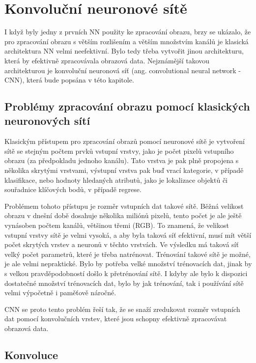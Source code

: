 \chapter{Konvoluční neuronové sítě}
\label{sec:CNN}

I když byly jedny z prvních NN použity ke zpracování obrazu, brzy se ukázalo,
že pro zpracování obrazu s větším rozlišením a větším množstvím kanálů je
klasická architektura NN velmi neefektivní. Bylo tedy třeba vytvořit jinou
architekturu, která by efektivně zpracovávala obrazová data. Nejznámější
takovou architekturou je konvoluční neuronová síť (ang. convolutional neural
network - CNN), která bude popsána v této kapitole.

\section{Problémy zpracování obrazu pomocí klasických neuronových sítí}

Klasickým přístupem pro zpracování obrazů pomocí neuronové sítě je vytvoření
sítě se stejným počtem prvků vstupní vrstvy, jako je počet pixelů vstupního
obrazu (za předpokladu jednoho kanálu). Tato vrstva je pak plně propojena s
několika skrytými vrstvami, výstupní vrstva pak buď vrací kategorie, v případě
klasifikace, nebo hodnoty hledaných atributů, jako je lokalizace objektů či
souřadnice klíčových bodů, v případě regrese.

Problémem tohoto přístupu je rozměr vstupních dat takové sítě. Běžná velikost
obrazu v dnešní době dosahuje několika miliónů pixelů, tento počet je ale ještě
vynásoben počtem kanálů, většinou třemi (RGB). To znamená, že velikost vstupní
vrstvy sítě je velmi vysoká, a aby byla taková síť efektivní, musí mít větší
počet skrytých vrstev a neuronů v těchto vrstvách. Ve výsledku má taková síť
velký počet parametrů, které je třeba natrénovat. Trénování takové sítě je
možné, je ale velmi nepraktické. Bylo by potřeba velké množství trénovacích
dat, jinak by s velkou pravděpodobností došlo k přetrénování sítě. I kdyby ale
bylo k dispozici dostatečné množství trénovacích dat, bylo by jak trénování,
tak i používání sítě velmi výpočetně i paměťově náročné.

CNN se proto tento problém řeší tak, že se snaží zredukovat rozměr vstupních
dat pomocí konvolučních vrstev, které jsou schopny efektivně zpracovávat
obrazová data.

\section{Konvoluce}

